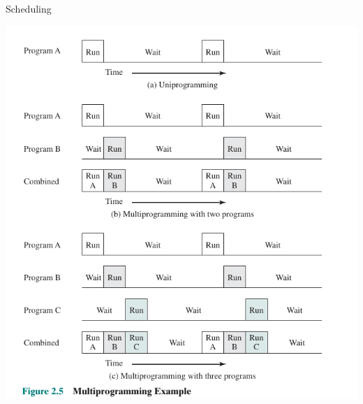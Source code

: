 \documentclass[10pt]{beamer}
\begin{document}
\begin{frame}[allowframebreaks]{Scheduling}
 \begin{center}
    \includegraphics[keepaspectratio, width=\textwidth, height=\textheight-2\baselineskip-2\baselineskip]{img/011_sched__.png} \\ \framebreak

\end{center}
\end{frame}
\end{document}
